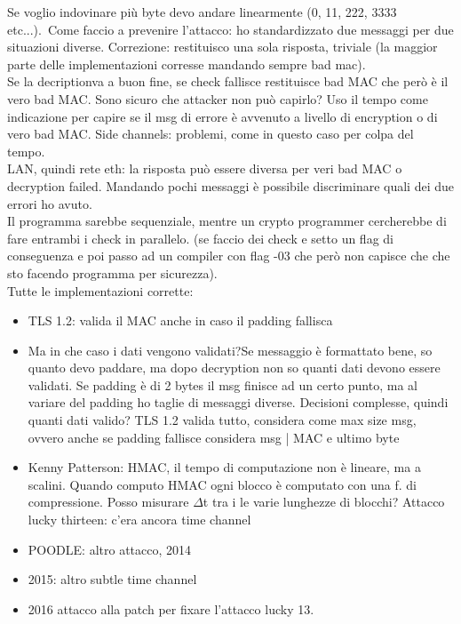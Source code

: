 \documentclass[16px]{article}
\begin{document}
Se voglio indovinare più byte devo andare linearmente (0, 11, 222, 3333 etc...).\ Come faccio a prevenire l'attacco: ho standardizzato due messaggi per due situazioni diverse. Correzione: restituisco una sola risposta, triviale (la maggior parte delle implementazioni corresse mandando sempre bad mac).\\ Se la decriptionva a buon fine, se check fallisce restituisce bad MAC che però è il vero bad MAC. Sono sicuro che attacker non può capirlo? Uso il tempo come indicazione per capire se il msg di errore è avvenuto a livello di encryption o di vero bad MAC. Side channels: problemi, come in questo caso per colpa del tempo.\\ LAN, quindi rete eth: la risposta può essere diversa per veri bad MAC o decryption failed. Mandando pochi messaggi è possibile discriminare quali dei due errori ho avuto.\\ Il programma sarebbe sequenziale, mentre un crypto programmer cercherebbe di fare entrambi i check in parallelo. (se faccio dei check e setto un flag di conseguenza e poi passo ad un compiler con flag -03 che però non capisce che che sto facendo programma per sicurezza).\\ Tutte le implementazioni corrette:
\begin{itemize}
\item TLS 1.2: valida il MAC anche in caso il padding fallisca
\item Ma in che caso i dati vengono validati?Se messaggio è formattato bene, so quanto devo paddare, ma dopo decryption non so quanti dati devono essere validati. Se padding è di 2 bytes il msg finisce ad un certo punto, ma al variare del padding ho taglie di messaggi diverse. Decisioni complesse, quindi quanti dati valido? TLS 1.2 valida tutto, considera come max size msg, ovvero anche se padding fallisce considera msg | MAC e ultimo byte
\item Kenny Patterson: HMAC, il tempo di computazione non è lineare, ma a scalini. Quando computo HMAC ogni blocco è computato con una f. di compressione. Posso misurare $\Delta$t tra i le varie lunghezze di blocchi? Attacco lucky thirteen: c'era ancora time channel
\item POODLE: altro attacco, 2014
\item 2015: altro subtle time channel
\item 2016 attacco alla patch per fixare l'attacco lucky 13.
\end{itemize}
\end{document}
